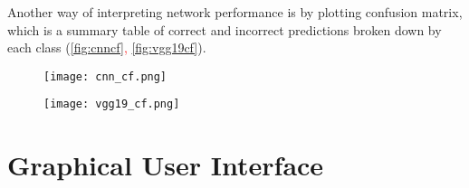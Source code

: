 Another way of interpreting network performance is by plotting confusion matrix, which is a summary table of correct and incorrect predictions broken down by each class (\textcolor{red}{\autoref{fig:cnncf}, \autoref{fig:vgg19cf}}).

\begin{figure}[h]
	\centering
	\begin{minipage}{.5\textwidth}
		\centering
		\hspace*{-0.7cm}
		\texttt{[image: cnn\_cf.png]}
		\label{fig:cnncf}
	\end{minipage}%
	\begin{minipage}{.5\textwidth}
		\centering
		\hspace*{-0.7cm}
		\texttt{[image: vgg19\_cf.png]}
		\label{fig:vgg19cf}
	\end{minipage}
\end{figure}

\clearpage

\section{Graphical User Interface} 
\label{gui}

